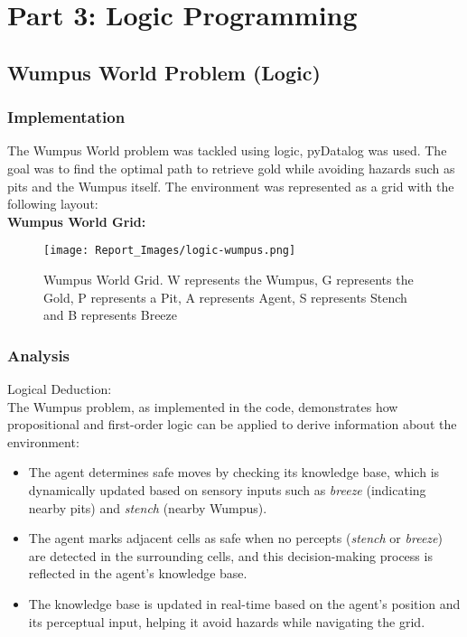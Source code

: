 \documentclass[12pt]{article}
\begin{document}
\newpage

\section{Part 3: Logic Programming}
\subsection{Wumpus World Problem (Logic)}
\subsubsection{Implementation}
The Wumpus World problem was tackled using logic, pyDatalog was used. The goal was to find the optimal path to retrieve gold while avoiding hazards such as pits and the Wumpus itself. The environment was represented as a grid with the following layout:\\

\textbf{Wumpus World Grid:}
\begin{figure}[h!]
    \centering
    \texttt{[image: Report\_Images/logic-wumpus.png]} %
    \caption{Wumpus World Grid. W represents the Wumpus, G represents the Gold, P represents a Pit, A represents Agent, S represents Stench and B represents Breeze}
    \label{fig:wumpus_world_grid}
\end{figure}

\newpage
\subsubsection{Analysis}
Logical Deduction: \\
The Wumpus problem, as implemented in the code, demonstrates how propositional and first-order logic can be applied to derive information about the environment:
\begin{itemize}
    \item The agent determines safe moves by checking its knowledge base, which is dynamically updated based on sensory inputs such as \textit{breeze} (indicating nearby pits) and \textit{stench} (nearby Wumpus).
    \item The agent marks adjacent cells as safe when no percepts (\textit{stench} or \textit{breeze}) are detected in the surrounding cells, and this decision-making process is reflected in the agent’s knowledge base.
    \item The knowledge base is updated in real-time based on the agent's position and its perceptual input, helping it avoid hazards while navigating the grid.
\end{itemize}
\end{document}
